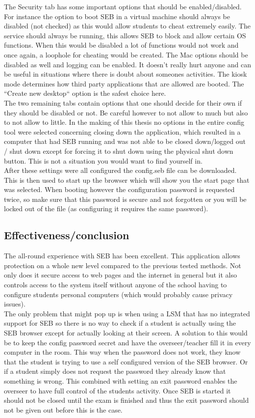 The Security tab  has some important options that should be enabled/disabled. For instance the option to boot SEB in a virtual machine should always be disabled (not checked) as this would allow students to cheat extremely easily. The service should always be running, this allows SEB to block and allow certain OS functions. When this would be disabled a lot of functions would not work and once again, a loophole for cheating would be created. The Mac options should be disabled as well and logging can be enabled. It doesn't really hurt anyone and can be useful in situations where there is doubt about someones activities. The kiosk mode determines how third party applications that are allowed are booted. The ``Create new desktop`` option is  the safest choice here.\\

The two remaining tabs contain options that one should decide for their own if they should be disabled or not. Be careful however to not allow to much but also to not allow to little. In the making of this thesis no options in the entire config tool were selected concerning closing down the application, which resulted in a computer that had SEB running and was not able to be closed down/logged out / shut down except for forcing it to shut down using the physical shut down button. This is not a situation you would want to find yourself in.\\

After these settings were all configured the config.seb file can be downloaded. This is then used to start up the browser which will show you the start page that was selected. When booting however the configuration password is requested twice, so make sure that this password is secure and not forgotten or you will be locked out of the file (as configuring it requires the same password).
\subsection{Effectiveness/conclusion}
The all-round experience with SEB has been excellent. This application allows protection on a whole new level compared to the previous tested methods. Not only does it secure access to web pages and the internet in general but it also controls access to the system itself without anyone of the school having to configure students personal computers (which would probably cause  privacy issues).\\

The only problem that might pop up is when using a LSM that has no integrated support for SEB so there is no way to check if a student is actually using the SEB browser except for actually looking at their screen. A solution to this would be to keep the config password secret and have the overseer/teacher fill it in every computer in the room. This way when the password does not work, they know that the student is trying to use a self configured version of the SEB browser. Or if a student simply does not request the password they already know that something is wrong. This combined with setting an exit password enables the overseer to have full control of the students activity. Once SEB is started it should not be closed until the exam is finished and thus the exit password should not be given out before this is the case.